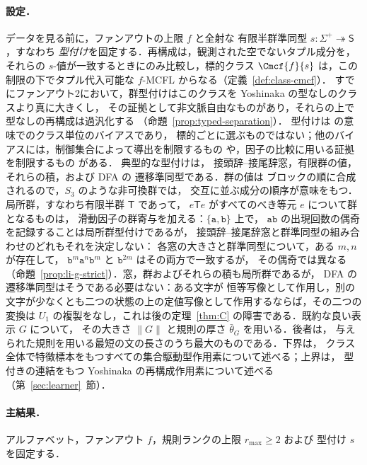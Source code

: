 \paragraph{設定．}
データを見る前に，ファンアウトの上限 $f$ と全射な
有限半群準同型 $s:\Sigma^+\twoheadrightarrow\mathsf S$，すなわち
\emph{型付け}を固定する．再構成は，観測された空でないタプル成分を，
それらの $s$-値が一致するときにのみ比較し，標的クラス $\Cmcf{f}{s}$
は，この制限の下でタプル代入可能な $f$-MCFL からなる（定義~\ref{def:class-cmcf}）．
すでにファンアウト2において，群型付けはこのクラスを Yoshinaka の型なしのクラスより真に大きくし，
その証拠として非文脈自由なものがあり，それらの上で型なしの再構成は過汎化する
（命題~\ref{prop:typed-separation}）．
型付けは \cite{CosteTyping2004} の意味でのクラス単位のバイアスであり，
標的ごとに選ぶものではない；他のバイアスには，制御集合によって導出を制限するもの
\cite{Takada1988,Takada1995} や，因子の比較に用いる証拠を制限するもの
\cite{CosteGaretNicolas2012,CosteNicolas2019} がある．
典型的な型付けは，
接頭辞--接尾辞窓，有限群の値，それらの積，および DFA の
遷移準同型である．群の値は
ブロックの順に合成されるので，$S_3$ のような非可換群では，
交互に並ぶ成分の順序が意味をもつ．局所群，すなわち有限半群 $\mathsf T$ であって，
$e\mathsf Te$ がすべてのべき等元 $e$ について群となるものは，
滑動因子の群寄与を加える：$\{\mathtt a,\mathtt b\}$ 上で，
$\mathtt{ab}$ の出現回数の偶奇を記録することは局所群型付けであるが，
接頭辞--接尾辞窓と群準同型の組み合わせのどれもそれを決定しない：
各窓の大きさと群準同型について，ある $m,n$ が存在して，
$\mathtt b^m\mathtt a^{n}\mathtt b^m$ と $\mathtt b^{2m}$ はその両方で一致するが，
その偶奇では異なる
（命題~\ref{prop:li-g-strict}）．窓，群およびそれらの積も局所群であるが，
DFA の遷移準同型はそうである必要はない：ある文字が
恒等写像として作用し，別の文字が少なくとも二つの状態の上の定値写像として作用するならば，その二つの変換は
$U_1$ の複製をなし，これは後の定理~\ref{thm:C} の障害である．既約な良い表示 $G$ について，
その大きさ $\|G\|$ と規則の厚さ $\bar\theta_G$ を用いる．後者は，
与えられた規則を用いる最短の文の長さのうち最大のものである．下界は，
クラス全体で特徴標本をもつすべての集合駆動型作用素について述べる；上界は，
型付きの連結をもつ Yoshinaka の再構成作用素について述べる（第~\ref{sec:learner}~節）．

\paragraph{主結果．}
アルファベット，ファンアウト $f$，規則ランクの上限 $r_{\max}\ge2$ および
型付け $s$ を固定する．

